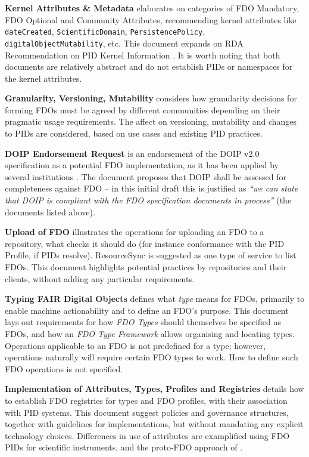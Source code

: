 \textbf{Kernel Attributes \& Metadata} \cite{Weigel 2022} elaborates on categories of FDO Mandatory, FDO Optional and Community Attributes, recommending kernel attributes like \texttt{dateCreated}, \texttt{ScientificDomain}, \texttt{PersistencePolicy}, \texttt{digitalObjectMutability}, etc. This document expands on RDA Recommendation on PID Kernel Information \cite{Weigel 2018}. It is worth noting that both documents are relatively abstract and do not establish PIDs or namespaces for the kernel attributes.

\textbf{Granularity, Versioning, Mutability} \cite{Hellström 2022} considers how granularity decisions for forming FDOs must be agreed by different communities depending on their pragmatic usage requirements. The affect on versioning, mutability and changes to PIDs are considered, based on use cases and existing PID practices.

\textbf{DOIP Endorsement Request} \cite{Schwardmann 2022a} is an endorsement of the \acrshort{DOIP} v2.0 \cite{DONA 2018} specification as a potential FDO implementation, as it has been applied by several institutions \cite{Wittenburg 2022a}. The document proposes that DOIP shall be assessed for completeness against FDO -- in this initial draft this is justified as \emph{``we can state that DOIP is compliant with the FDO specification documents in process''} (the documents listed above).

\textbf{Upload of FDO} \cite{Blanchi 2022} illustrates the operations for uploading an FDO to a repository, what checks it should do (for instance conformance with the PID Profile, if PIDs resolve). ResourceSync \cite{ANSI/NISO Z39.99-2017} is suggested as one type of service to list FDOs. This document highlights potential practices by repositories and their clients, without adding any particular requirements.

\textbf{Typing FAIR Digital Objects} \cite{Lannom 2022c} defines what \emph{type} means for FDOs, primarily to enable machine actionability and to define an FDO's purpose. This document lays out requirements for how \emph{FDO Types} should themselves be specified as FDOs, and how an \emph{FDO Type Framework} allows organising and locating types. Operations applicable to an FDO is not predefined for a type; however, operations naturally will require certain FDO types to work. How to define such FDO operations is not specified.

\textbf{Implementation of Attributes, Types, Profiles and Registries} \cite{Blanchi 2023} details how to establish FDO registries for types and FDO profiles, with their association with PID systems. This document suggest policies and governance structures, together with guidelines for implementations, but without mandating any explicit technology choices. Differences in use of attributes are examplified using FDO PIDs for scientific instruments, and the proto-FDO approach of  \cite{Schwardmann 2022b}.

